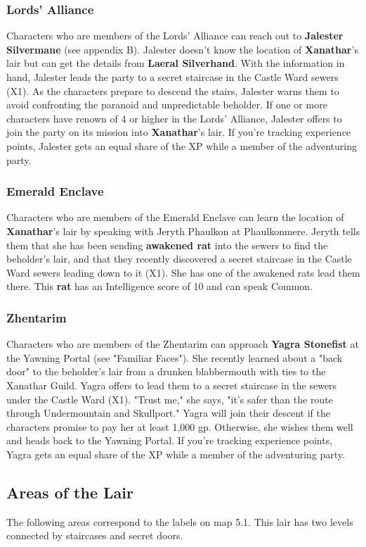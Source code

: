 \documentclass[10pt,a4paper,twoside,twocolumn,openany,nodeprecatedcode]{dndbook}
\begin{document}
\subsubsection{Lords' Alliance}
Characters who are members of the Lords' Alliance can reach out to \textbf{Jalester Silvermane} (see appendix B). Jalester doesn't know the location of \textbf{Xanathar}'s lair but can get the details from \textbf{Laeral Silverhand}.
With the information in hand, Jalester leads the party to a secret staircase in the Castle Ward sewers (X1). As the characters prepare to descend the stairs, Jalester warns them to avoid confronting the paranoid and unpredictable beholder.
If one or more characters have renown of 4 or higher in the Lords' Alliance, Jalester offers to join the party on its mission into \textbf{Xanathar}'s lair. If you're tracking experience points, Jalester gets an equal share of the XP while a member of the adventuring party.
\subsubsection{Emerald Enclave}
Characters who are members of the Emerald Enclave can learn the location of \textbf{Xanathar}'s lair by speaking with Jeryth Phaulkon at Phaulkonmere. Jeryth tells them that she has been sending \textbf{awakened rat} into the sewers to find the beholder's lair, and that they recently discovered a secret staircase in the Castle Ward sewers leading down to it (X1). She has one of the awakened rats lead them there. This \textbf{rat} has an Intelligence score of 10 and can speak Common.
\subsubsection{Zhentarim}
Characters who are members of the Zhentarim can approach \textbf{Yagra Stonefist} at the Yawning Portal (see "Familiar Faces"). She recently learned about a "back door" to the beholder's lair from a drunken blabbermouth with ties to the Xanathar Guild. Yagra offers to lead them to a secret staircase in the sewers under the Castle Ward (X1). "Trust me," she says, "it's safer than the route through Undermountain and Skullport."
Yagra will join their descent if the characters promise to pay her at least 1,000 gp. Otherwise, she wishes them well and heads back to the Yawning Portal. If you're tracking experience points, Yagra gets an equal share of the XP while a member of the adventuring party.
\subsection{Areas of the Lair}
The following areas correspond to the labels on map 5.1. This lair has two levels connected by staircases and secret doors.
\end{document}
